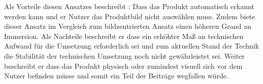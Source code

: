 Als Vorteile diesen Ansatzes beschreibt \citeauthor{Kirschner2012}: Dass das Produkt automatisch erkannt werden kann und er Nutzer das Produktbild nicht auswählen muss. Zudem biete dieser Ansatz im Vergleich zum 
bildzentrierten Ansatz einen höheren Grand an Immersion. Als Nachteile beschreibt er dass ein erhöhter Maß an technischen Aufwand für die Umsetzung erforderlich sei und zum aktuellen Stand der Technik die 
Stabilität der technischen Umsetzung noch nicht gewährleistet sei. Weiter beschreibt er dass das Produkt physisch oder zumindest visuell sich vor dem Nutzer befinden müsse und somit ein Teil der Beiträge wegfallen würde.\cite[S.~130]{Kirschner2012}








